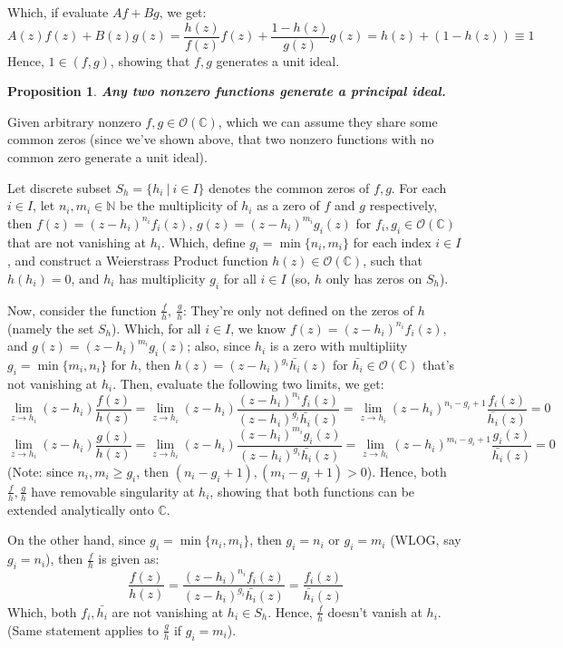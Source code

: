 \documentclass{article}
\newtheorem{proposition}{Proposition}
\begin{document}
\begin{itemize}
    Which, if evaluate $Af+Bg$, we get:
    $$A(z)f(z)+B(z)g(z)=\frac{h(z)}{f(z)}f(z)+\frac{1-h(z)}{g(z)}g(z)=h(z)+(1-h(z))\equiv 1$$
    Hence, $1\in (f,g)$, showing that $f,g$ generates a unit ideal.

    \hfil

    \begin{proposition}
        \textbf{Any two nonzero functions generate a principal ideal.}
    \end{proposition}

    Given arbitrary nonzero $f,g\in\mathcal{O}(\mathbb{C})$, which we can assume they share some common zeros (since we've shown above, that two nonzero functions with no common zero generate a unit ideal).

    Let discrete subset $S_h=\{h_i\ |\ i\in I\}$ denotes the common zeros of $f,g$. For each $i\in I$, let $n_i,m_i\in\mathbb{N}$ be the multiplicity of $h_i$ as a zero of $f$ and $g$ respectively, then $f(z)=(z-h_i)^{n_i}f_i(z)$, $g(z)=(z-h_i)^{m_i}g_i(z)$ for $f_i,g_i\in\mathcal{O}(\mathbb{C})$ that are not vanishing at $h_i$. Which, define $g_i=\min\{n_i,m_i\}$ for each index $i\in I$,
    and construct a Weierstrass Product function $h(z)\in\mathcal{O}(\mathbb{C})$, such that $h(h_i)=0$, and $h_i$ has multiplicity $g_i$ for all $i\in I$ (so, $h$ only has zeros on $S_h$).

    Now, consider the function $\frac{f}{h},\ \frac{g}{h}$: They're only not defined on the zeros of $h$ (namely the set $S_h$). Which, for all $i\in I$, we know $f(z)=(z-h_i)^{n_i}f_i(z)$, and $g(z)=(z-h_i)^{m_i}g_i(z)$;
    also, since $h_i$ is a zero with multipliity $g_i=\min\{m_i,n_i\}$ for $h$, then $h(z)=(z-h_i)^{g_i}\bar{h_i}(z)$ for $\bar{h_i}\in \mathcal{O}(\mathbb{C})$ that's not vanishing at $h_i$.
    Then, evaluate the following two limits, we get:
    $$\lim_{z\rightarrow h_i}(z-h_i)\frac{f(z)}{h(z)}=\lim_{z\rightarrow h_i}(z-h_i)\frac{(z-h_i)^{n_i}f_i(z)}{(z-h_i)^{g_i}\bar{h_i}(z)} = \lim_{z\rightarrow h_i}(z-h_i)^{n_i-g_i+1}\frac{f_i(z)}{\bar{h_i}(z)}=0$$
    $$\lim_{z\rightarrow h_i}(z-h_i)\frac{g(z)}{h(z)}=\lim_{z\rightarrow h_i}(z-h_i)\frac{(z-h_i)^{m_i}g_i(z)}{(z-h_i)^{g_i}\bar{h_i}(z)} = \lim_{z\rightarrow h_i}(z-h_i)^{m_i-g_i+1}\frac{g_i(z)}{\bar{h_i}(z)}=0$$
    (Note: since $n_i,m_i\geq g_i$, then $(n_i-g_i+1),(m_i-g_i+1)>0$).
    Hence, both $\frac{f}{h},\frac{g}{h}$ have removable singularity at $h_i$, showing that both functions can be extended analytically onto $\mathbb{C}$.

    On the other hand, since $g_i=\min\{n_i,m_i\}$, then $g_i=n_i$ or $g_i=m_i$ (WLOG, say $g_i=n_i$), then $\frac{f}{h}$ is given as:
    $$\frac{f(z)}{h(z)}=\frac{(z-h_i)^{n_i}f_i(z)}{(z-h_i)^{g_i}\bar{h_i}(z)} = \frac{f_i(z)}{\bar{h_i}(z)}$$
    Which, both $f_i,\bar{h_i}$ are not vanishing at $h_i\in S_h$. Hence, $\frac{f}{h}$ doesn't vanish at $h_i$. (Same statement applies to $\frac{g}{h}$ if $g_i=m_i$).


\end{itemize}
\end{document}
